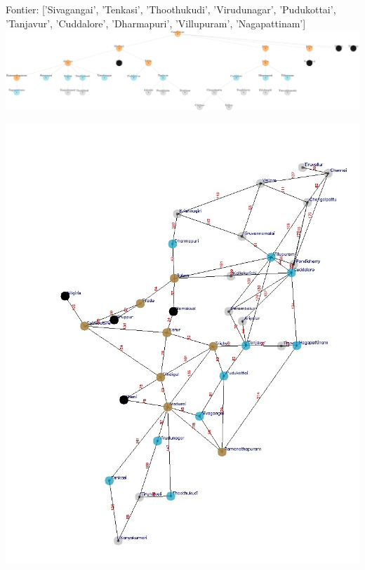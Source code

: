 \documentclass[xcolor=table]{beamer}
\begin{document}
\begin{frame}
  { \tiny Fontier: ['Sivagangai', 'Tenkasi', 'Thoothukudi', 'Virudunagar', 'Pudukottai', 'Tanjavur', 'Cuddalore', 'Dharmapuri', 'Villupuram', 'Nagapattinam']}
  \includegraphics[width=1\textwidth]{../BFSNodes/18-1.png}
  \begin{center}
    \includegraphics[height=0.55\textheight]{../BFSoutput/tamilBFS16.jpg}
  \end{center}
\end{frame}
\end{document}
